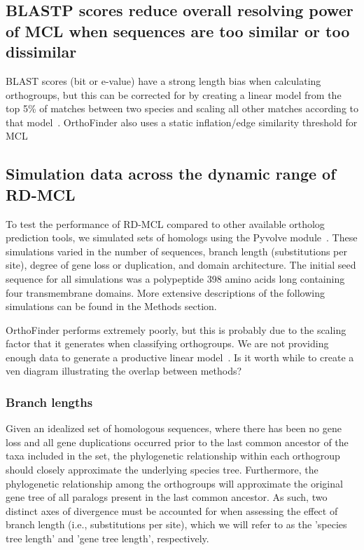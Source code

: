 \documentclass[twocolumn]{bmcart}%
\begin{document}
\lipsum[3]

\subsection{BLASTP scores reduce overall resolving power of MCL when sequences are too similar or too dissimilar}\label{subsec:blastpScoresReduceOverallResolvingPowerOfMclWhenSequencesAreTooSimilarOrTooDissimilar}
BLAST scores (bit or e-value) have a strong length bias when calculating orthogroups, but this can be corrected for by creating a linear model from the top 5\% of matches between two species and scaling all other matches according to that model~\cite{Emms:2015ig}.
OrthoFinder also uses a static inflation/edge similarity threshold for MCL~\cite{Emms:2015ig}


\subsection{Simulation data across the dynamic range of RD-MCL}\label{subsec:simulationDataAcrossTheDynamicRangeOfRd-mcl}
To test the performance of RD-MCL compared to other available ortholog prediction tools, we simulated sets of homologs using the Pyvolve module~\cite{Spielman:2015kv}.
These simulations varied in the number of sequences, branch length (substitutions per site), degree of gene loss or duplication, and domain architecture.
The initial seed sequence for all simulations was a polypeptide 398 amino acids long containing four transmembrane domains.
More extensive descriptions of the following simulations can be found in the Methods section.

OrthoFinder performs extremely poorly, but this is probably due to the scaling factor that it generates when classifying orthogroups.
We are not providing enough data to generate a productive linear model~\cite{Emms:2015ig}.
Is it worth while to create a ven diagram illustrating the overlap between methods?

\subsubsection{Branch lengths}
Given an idealized set of homologous sequences, where there has been no gene loss and all gene duplications occurred prior to the last common ancestor of the taxa included in the set, the phylogenetic relationship within each orthogroup should closely approximate the underlying species tree.
Furthermore, the phylogenetic relationship among the orthogroups will approximate the original gene tree of all paralogs present in the last common ancestor.
As such, two distinct axes of divergence must be accounted for when assessing the effect of branch length (i.e., substitutions per site), which we will refer to as the 'species tree length' and 'gene tree length', respectively.
\end{document}
